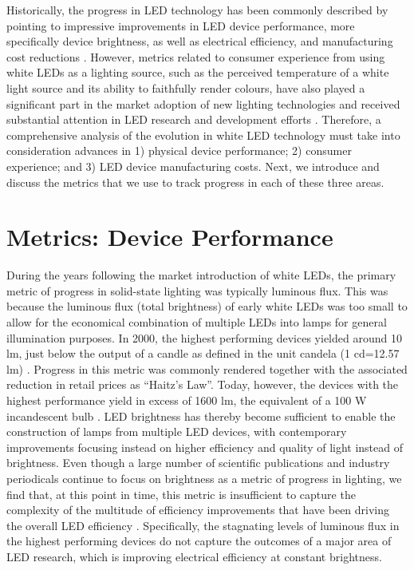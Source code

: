 \documentclass[parskip=full]{article}
\begin{document}
Historically, the progress in LED technology has been commonly described by pointing to impressive improvements in LED device performance, more specifically device brightness, as well as electrical efficiency, and manufacturing cost reductions \cite{Taki2019}. However, metrics related to consumer experience from using white LEDs as a lighting source, such as the perceived temperature of a white light source and its ability to faithfully render colours, have also played a significant part in the market adoption of new lighting technologies \cite{Menanteau2000,Sandahl2006,CAIRD2008,murphy2012governing} and received substantial attention in LED research and development efforts \cite{azevedo2009transition,cho2017white}. Therefore, a comprehensive analysis of the evolution in white LED technology must take into consideration advances in 1) physical device performance; 2) consumer experience; and 3) LED device manufacturing costs. Next, we introduce and discuss the metrics that we use to track progress in each of these three areas.

\section{Metrics: Device Performance}
\label{sec:device_performance_metrics}

During the years following the market introduction of white LEDs, the primary metric of progress in solid-state lighting was typically luminous flux. This was because the luminous flux (total brightness) of early white LEDs was too small to allow for the economical combination of multiple LEDs into lamps for general illumination purposes. In 2000, the highest performing devices yielded around 10 lm, just below the output of a candle as defined in the unit candela (1 cd=12.57 lm) \cite{haitz2011solid}. Progress in this metric was commonly rendered together with the associated reduction in retail prices as “Haitz’s Law”\cite{haitz1999case,haitz2011solid}. Today, however, the devices with the highest performance yield in excess of 1600 lm, the equivalent of a 100 W incandescent bulb \cite{cree2020bright}. LED brightness has thereby become sufficient to enable the construction of lamps from multiple LED devices, with contemporary improvements focusing instead on higher efficiency and quality of light instead of brightness. Even though a large number of scientific publications and industry periodicals continue to focus on brightness as a metric of progress in lighting, we find that, at this point in time, this metric is insufficient to capture the complexity of the multitude of efficiency improvements that have been driving the overall LED efficiency \cite{weinold2021compound}. Specifically, the stagnating levels of luminous flux in the highest performing devices do not capture the outcomes of a major area of LED research, which is improving electrical efficiency at constant brightness.
\end{document}
